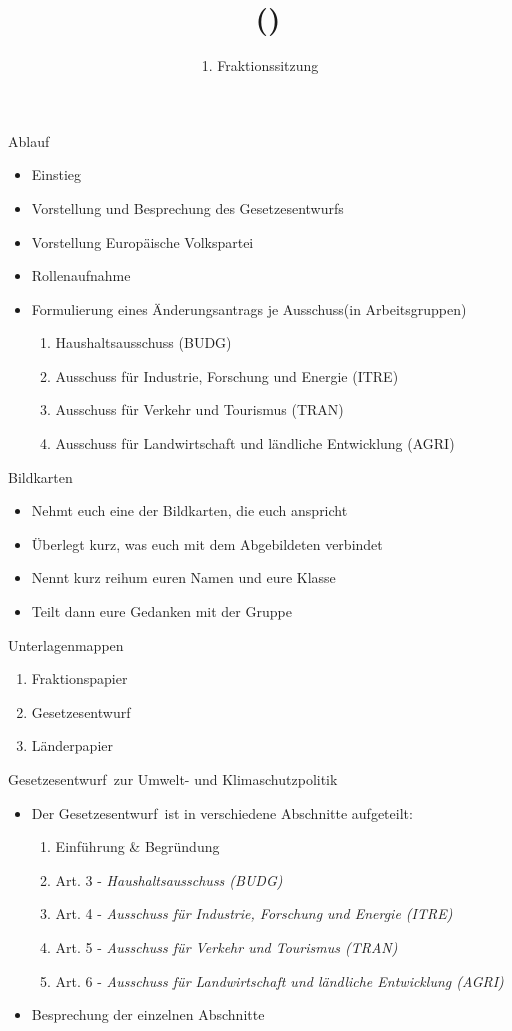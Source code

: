 \documentclass{beamer}
\title{\Fraktionsname\ (\Fraktionskuerzel)}
\subtitle{1. Fraktionssitzung}
\date{\datum}
\newcommand{\Fraktionsname}{Europäische Volkspartei}
\newcommand{\Fraktionsname}{Progressive Allianz der Sozialdemokraten}
\newcommand{\Fraktionsname}{Renew Europe}
\newcommand{\Fraktionsname}{Die Grünen/Europäische Freie Allianz}
\newcommand{\Fraktionsname}{Patrioten für Europa}
\newcommand{\Fraktionsname}{Die Linke}
\newcommand{\ausschuesse}{
   		     \begin{enumerate}
        		    \item Haushaltsausschuss (BUDG)
            		\item Ausschuss für Industrie, Forschung und Energie (ITRE)
    	    		    \item Ausschuss für Verkehr und Tourismus (TRAN)
    		        \item Ausschuss für Landwirtschaft und ländliche Entwicklung (AGRI)
	        \end{enumerate}
		}
\newcommand{\ausschussgruppen}{
        			\item Art. 3 - \textit{Haushaltsausschuss (BUDG)}
       		    \item Art. 4 - \textit{Ausschuss für Industrie, Forschung und Energie (ITRE)}
      		    \item Art. 5 - \textit{Ausschuss für Verkehr und Tourismus (TRAN)}
      		    \item Art. 6 - \textit{Ausschuss für Landwirtschaft und ländliche Entwicklung (AGRI)}
	    }
\newcommand{\entwurf}{Gesetzesentwurf}
\newcommand{\policy}{Umwelt- und Klimaschutzpolitik}
\newcommand{\ausschuesse}{
            \begin{enumerate}
                \item Haushaltsausschuss (BUDG)
				\item Ausschuss für Beschäftigung und soziale Angelegenheiten (EMPL)
                \item Unterausschuss für Menschenrechte (DROI)
				\item Ausschuss für bürgerliche Freiheiten, Justiz und Inneres (LIBE)
            \end{enumerate}
    		}
\newcommand{\ausschussgruppen}{
                	\item Art. 3 - \textit{Haushaltsausschuss (BUDG)}
				\item Art. 4 - \textit{Ausschuss für Beschäftigung und soziale Angelegenheiten (EMPL)}
                	\item Art. 5 - \textit{Unterausschuss für Menschenrechte (DROI)}
				\item Art. 6 - \textit{Ausschuss für bürgerliche Freiheiten, Justiz und Inneres (LIBE)}
    		}
\newcommand{\entwurf}{Gesetzesentwurf}
\newcommand{\policy}{Asylpolitik}
\newcommand{\ausschuesse}{
            \begin{enumerate}
                \item Haushaltsausschuss (BUDG)
                \item Ausschuss für bürgerliche Freiheiten, Justiz und Inneres (LIBE)
                \item Ausschuss für Sicherheit und Verteidigung (SEDE)
            \end{enumerate}
    		}
\newcommand{\ausschussgruppen}{
            		\item Finanzierung - \newline \textit{Haushaltsausschuss (BUDG)}
	            	\item Dienstrecht - \newline \textit{Ausschuss für bürgerliche Freiheiten, Justiz und Inneres (LIBE)}
    		        \item Gegenstand und Ziele - \textit{Ausschuss für Sicherheit und Verteidigung (SEDE)}
	    	}
\newcommand{\entwurf}{Entschließungsentwurf}
\newcommand{\policy}{Außen- und Sicherheitspolitik}
\begin{document}
\frame{\titlepage}

\begin{frame}{Ablauf}
\vspace{-1.5cm}
\begin{itemize}
    \item Einstieg
    \item Vorstellung und Besprechung des \entwurf s
    \item Vorstellung \Fraktionsname
    \item Rollenaufnahme
    \item Formulierung eines Änderungsantrags je Ausschuss\newline (in Arbeitsgruppen)
    \ausschuesse
\end{itemize}
\end{frame}

\begin{frame}{Bildkarten}
\vspace{-1cm}
\begin{itemize}
    \item Nehmt euch eine der Bildkarten, die euch anspricht
    \item Überlegt kurz, was euch mit dem Abgebildeten verbindet
    \item Nennt kurz reihum euren Namen und eure Klasse
    \item Teilt dann eure Gedanken mit der Gruppe
\end{itemize}
\end{frame}

\begin{frame}{Unterlagenmappen}
\vspace{-1cm}
\begin{enumerate}
    \item Fraktionspapier
    \item \entwurf
    \item Länderpapier
\end{enumerate}
\end{frame}

\begin{frame}{\entwurf\ zur \policy}
\vspace{-1cm}
\begin{itemize}
	\item Der \entwurf\ ist in verschiedene Abschnitte aufgeteilt:
	\begin{enumerate}
		\item Einführung \& Begründung
		\ausschussgruppen	
	\end{enumerate}
	\item Besprechung der einzelnen Abschnitte
\end{itemize}
\end{frame}
\end{document}
